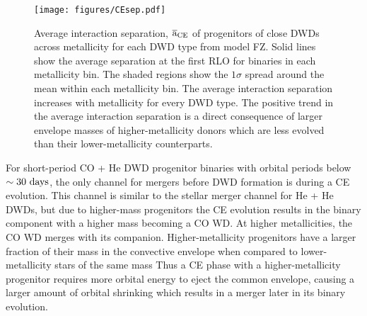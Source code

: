 \documentclass[twocolumn]{aastex631}
\begin{document}
\begin{figure*}
	\texttt{[image: figures/CEsep.pdf]}
    \caption{Average interaction separation, $\overline{\mathrm{a}}_{\rm{CE}}$ of progenitors of close DWDs across metallicity for each DWD type from model FZ. Solid lines show the average separation at the first RLO for binaries in each metallicity bin. The shaded regions show the $1\sigma$ spread around the mean within each metallicity bin. The average interaction separation increases with metallicity for every DWD type. The positive trend in the average interaction separation is a direct consequence of larger envelope masses of higher-metallicity donors which are less evolved than their lower-metallicity counterparts.} 
    \label{fig:CEsep}
\end{figure*}


For short-period CO + He DWD progenitor binaries with orbital periods below $\sim30~\rm{days}$, the only channel for mergers before DWD formation is during a CE evolution. This channel is similar to the stellar merger channel for He + He DWDs, but due to higher-mass progenitors the CE evolution results in the binary component with a higher mass becoming a CO WD. At higher metallicities, the CO WD merges with its companion. Higher-metallicity progenitors have a larger fraction of their mass in the convective envelope when compared to lower-metallicity stars of the same mass \citep{Amard2019, Amard2020} Thus a CE phase with a higher-metallicity progenitor requires more orbital energy to eject the common envelope, causing a larger amount of orbital shrinking which results in a merger later in its binary evolution.
\end{document}
